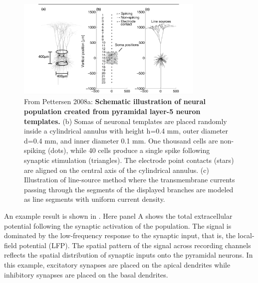 \begin{figure}[!ht]
\begin{center}
\includegraphics[width=0.8\textwidth]{Figures/Spikes/MUA-2}
\end{center}
\caption[]{
From Pettersen 2008a: \textbf{Schematic illustration of neural population created from pyramidal layer-5 neuron templates.} (b) Somas of neuronal templates are placed randomly inside a cylindrical annulus with height h=0.4 mm, outer diameter d=0.4 mm, and inner diameter 0.1 mm. One thousand cells are non-spiking (dots), while 40 cells produce a single spike following synaptic stimulation
(triangles). The electrode point contacts (stars) are aligned on the central axis of the cylindrical annulus. (c) Illustration of line-source method where the transmembrane currents passing through the 
segments of the displayed branches are modeled as line segments with uniform current density.}
\label{fig:Spikes:MUA-population}
\end{figure}

An example result is shown in . Here panel A shows the total extracellular potential following the synaptic activation of the population. The signal is dominated by the low-frequency response to the synaptic input, that is, the local-field potential (LFP). The spatial pattern of the signal across recording channels reflects the
spatial distribution of synaptic inputs onto the pyramidal neurons. In this example, excitatory synapses are placed on the apical dendrites while inhibitory synapses are placed on the basal dendrites.

